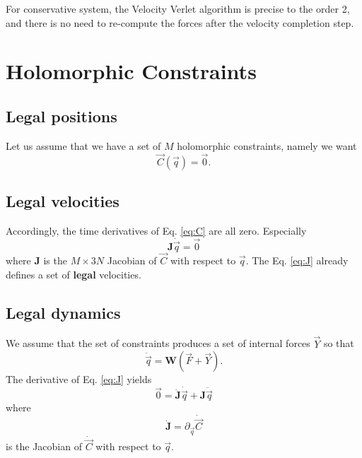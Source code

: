 \documentclass[aps,twocolumn]{revtex4}
\newcommand{\mymat}[1]{\boldsymbol{#1}}
\begin{document}
For conservative system, the Velocity Verlet algorithm is precise to the order 2, and there is
no need to re-compute the forces after the velocity completion step.

\section{Holomorphic Constraints}
\subsection{Legal positions}

Let us assume that we have a set of $M$ holomorphic constraints, namely we want
\begin{equation}
	\label{eq:C}
	\vec{C}\left(\vec{q}\right) = \vec{0}.
\end{equation}

\subsection{Legal velocities}
Accordingly, the time derivatives of Eq. \eqref{eq:C} are all zero.
Especially
\begin{equation}
	\label{eq:J}
	\mymat{J}\dot{\vec{q}} = \vec{0}
\end{equation}
where $\mymat{J}$ is the $M\times 3N$ Jacobian of $\vec{C}$ with respect to $\vec{q}$.
The Eq. \eqref{eq:J} already defines a set of \textbf{legal} velocities.

\subsection{Legal dynamics}
We assume that the set of constraints produces a set of internal forces $\vec{Y}$ so that
\begin{equation}
	\ddot{\vec{q}} = \mymat{W} \left( \vec{F} + \vec{Y} \right).
\end{equation}
The derivative of Eq. \eqref{eq:J} yields
\begin{equation}
	\vec{0} = \dot{\mymat{J}}\dot{\vec{q}} + \mymat{J}\ddot{\vec{q}}
\end{equation}
where
\begin{equation}
	\dot{\mymat{J}} = \partial_{\vec{q}} \dot{\vec{C}}
\end{equation}
is the Jacobian of $\dot{\vec{C}}$ with respect to $\vec{q}$.
\end{document}
